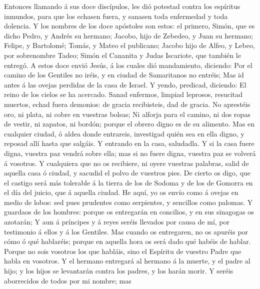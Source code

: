  Entonces llamando á sus doce discípulos, les dió potestad
contra los espíritus inmundos, para que los echasen fuera, y sanasen
toda enfermedad y toda dolencia.  Y los nombres de los
doce apóstoles son estos: el primero, Simón, que es dicho Pedro, y
Andrés su hermano; Jacobo, hijo de Zebedeo, y Juan su hermano;
 Felipe, y Bartolomé; Tomás, y Mateo el publicano; Jacobo
hijo de Alfeo, y Lebeo, por sobrenombre Tadeo;  Simón el
Cananita y Judas Iscariote, que también le entregó.  A
estos doce envió Jesús, á los cuales dió mandamiento, diciendo: Por el
camino de los Gentiles no iréis, y en ciudad de Samaritanos no entréis;
 Mas id antes á las ovejas perdidas de la casa de Israel.
 Y yendo, predicad, diciendo: El reino de los cielos se ha
acercado.  Sanad enfermos, limpiad leprosos, resucitad
muertos, echad fuera demonios: de gracia recibisteis, dad de gracia.
 No aprestéis oro, ni plata, ni cobre en vuestras bolsas;
 Ni alforja para el camino, ni dos ropas de vestir, ni
zapatos, ni bordón; porque el obrero digno es de su alimento.
 Mas en cualquier ciudad, ó aldea donde entrareis,
investigad quién sea en ella digno, y reposad allí hasta que salgáis.
 Y entrando en la casa, saludadla.  Y si
la casa fuere digna, vuestra paz vendrá sobre ella; mas si no fuere
digna, vuestra paz se volverá á vosotros.  Y cualquiera
que no os recibiere, ni oyere vuestras palabras, salid de aquella casa ó
ciudad, y sacudid el polvo de vuestros pies.  De cierto
os digo, que el castigo será más tolerable á la tierra de los de Sodoma
y de los de Gomorra en el día del juicio, que á aquella ciudad.
 He aquí, yo os envío como á ovejas en medio de lobos:
sed pues prudentes como serpientes, y sencillos como palomas.
 Y guardaos de los hombres: porque os entregarán en
concilios, y en sus sinagogas os azotarán;  Y aun á
príncipes y á reyes seréis llevados por causa de mí, por testimonio á
ellos y á los Gentiles.  Mas cuando os entregaren, no os
apuréis por cómo ó qué hablaréis; porque en aquella hora os será dado
qué habéis de hablar.  Porque no sois vosotros los que
habláis, sino el Espíritu de vuestro Padre que habla en vosotros.
 Y el hermano entregará al hermano á la muerte, y el
padre al hijo; y los hijos se levantarán contra los padres, y los harán
morir.  Y seréis aborrecidos de todos por mi nombre; mas
